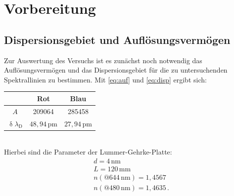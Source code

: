 \section{Vorbereitung}
\subsection{Dispersionsgebiet und Auflösungsvermögen}
\label{sec:dispersion}
Zur Auswertung des Versuchs ist es zunächst noch notwendig das Auflösungsvermögen und das Dispersionsgebiet für die zu untersuchenden Spektrallinien zu bestimmen. Mit \eqref{eq:auf} und
\eqref{eq:disp} ergibt sich:\\
\begin{table}[]
\centering
\begin{tabular}{c|cc}
 & Rot  & Blau\\
 \hline
$A$ & 209064  & 285458 \\
$\updelta \lambda_\text{D}$ & $48{,}94\,\si{\pico\meter}$ &$27{,}94\,\si{\pico\meter}$
\end{tabular}
\end{table}\\
Hierbei sind die Parameter der Lummer-Gehrke-Platte:
\begin{align*}
&d=4\,\si{\nm}\\
&L=120\,\si{\mm}\\
&n\left(@644\,\si{\nm}\right)=1{,}4567\\
&n\left(@480\,\si{\nm}\right)=1{,}4635\,.
\end{align*}
\clearpage
